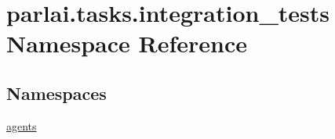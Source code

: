 \hypertarget{namespaceparlai_1_1tasks_1_1integration__tests}{}\section{parlai.\+tasks.\+integration\+\_\+tests Namespace Reference}
\label{namespaceparlai_1_1tasks_1_1integration__tests}
\subsection*{Namespaces}
\begin{DoxyCompactItemize}
\item 
 \hyperlink{namespaceparlai_1_1tasks_1_1integration__tests_1_1agents}{agents}
\end{DoxyCompactItemize}
